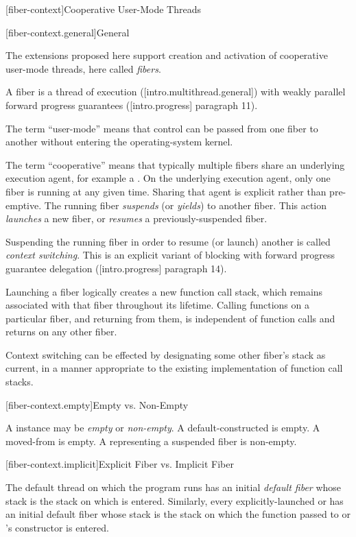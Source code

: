 \newpage

\setcounter{section}{33}
\setcounter{subsection}{10}

\label{api}

[fiber-context]{Cooperative User-Mode Threads}

[fiber-context.general]{General}

The extensions proposed here support creation and activation of cooperative
user-mode threads, here called \emph{fibers}.

A fiber is a thread of execution ([intro.multithread.general]) with
weakly parallel forward progress guarantees ([intro.progress] paragraph 11).

The term ``user-mode'' means that control can be passed from one fiber to
another without entering the operating-system kernel.

The term ``cooperative'' means that typically multiple fibers share an
underlying execution agent, for example a . On the
underlying execution agent, only one fiber is running at any given time. Sharing
that agent is explicit rather than pre-emptive. The running
fiber \emph{suspends} (or \emph{yields}) to another fiber. This
action \emph{launches} a new fiber, or \emph{resumes} a previously-suspended
fiber.

Suspending the running fiber in order to resume (or launch) another is
called \emph{context switching}. This is an explicit variant of blocking with
forward progress guarantee delegation ([intro.progress] paragraph 14).

Launching a fiber logically creates a new function call stack, which remains
associated with that fiber throughout its lifetime. Calling functions on a
particular fiber, and returning from them, is independent of function calls
and returns on any other fiber.

Context switching can be effected by designating some other fiber's stack as
current, in a manner appropriate to the existing implementation of function call stacks.

[fiber-context.empty]{Empty vs. Non-Empty}

A \fiber instance may be \emph{empty} or \emph{non-empty}. A
default-constructed \fiber is empty. A moved-from \fiber is empty. A \fiber
representing a suspended fiber is non-empty.

[fiber-context.implicit]{Explicit Fiber vs. Implicit Fiber}

The default thread on which the program runs \main has an
initial \emph{default fiber} whose stack is the stack on which \main is
entered.  Similarly, every explicitly-launched
 or  has an initial default fiber whose
stack is the stack on which the function passed to  or
's constructor is entered.

